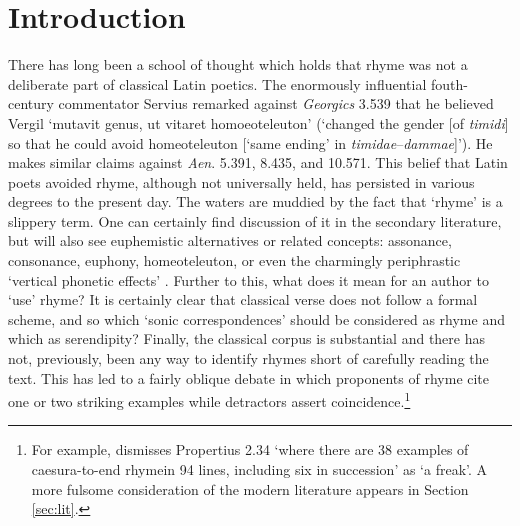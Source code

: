 \documentclass[twocolumn, switch, a4paper]{article} %
\begin{document}
\section{Introduction}


There has long been a school of thought which holds that rhyme was not a
deliberate part of classical Latin poetics. The enormously influential
fouth-century commentator Servius remarked against \emph{Georgics} 3.539 that
he believed Vergil `mutavit genus, ut vitaret homoeoteleuton' (`changed the
gender [of \emph{timidi}] so that he could avoid homeoteleuton [`same ending'
in \emph{timidae}--\emph{dammae}]'). He makes similar claims against
\emph{Aen}. 5.391, 8.435, and 10.571. This belief that Latin poets avoided
rhyme, although not universally held, has persisted in various degrees to the
present day. The waters are muddied by the fact that `rhyme' is a slippery
term. One can certainly find discussion of it in the secondary literature, but
will also see euphemistic alternatives or related concepts: assonance,
consonance, euphony, homeoteleuton, or even the charmingly periphrastic
`vertical phonetic effects' \cite{vine_vertical_1989}. Further to this, what
does it mean for an author to `use' rhyme? It is certainly clear that
classical verse does not follow a formal scheme, and so which `sonic
correspondences' should be considered as rhyme and which as serendipity?
Finally, the classical corpus is substantial and there has not, previously,
been any way to identify rhymes short of carefully reading the text. This has
led to a fairly oblique debate in which proponents of rhyme cite one or two
striking examples while detractors assert coincidence.\footnote{
  For example,  dismisses Propertius 2.34
  `where there are 38 examples of caesura-to-end rhyme\textellipsis in 94 lines,
  including six in succession' as `a freak'. A more fulsome consideration of the
  modern literature appears in Section \ref{sec:lit}.
}
\end{document}

